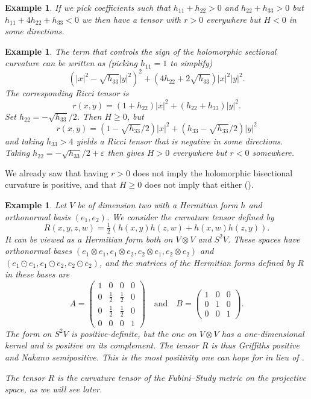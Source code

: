 \documentclass[11pt]{article}
\newtheorem{exam}[theo]{Example}
\def\qandq{\quad\text{and}\quad}
\begin{document}
\begin{exam}
If we pick coefficients such that $h_{11} + h_{22} > 0$ and $h_{22} + h_{33} > 0$ but $h_{11} + 4h_{22} + h_{33} < 0$ we then have a tensor with $r > 0$ everywhere but $H < 0$ in some directions.
\end{exam}

\begin{exam}
The term that controls the sign of the holomorphic sectional curvature can be written as (picking $h_{11} = 1$ to simplify)
$$
(|x|^2 - \sqrt{h_{33}}|y|^2)^2 + (4h_{22} + 2\sqrt{h_{33}})|x|^2|y|^2.
$$
The corresponding Ricci tensor is
$$
r(x,y) = (1 + h_{22})|x|^2 + (h_{22} + h_{33}) |y|^2.
$$
Set $h_{22} = -\sqrt{h_{33}}/2$. Then $H \geq 0$, but
$$
r(x,y) = (1-\sqrt{h_{33}}/2)|x|^2 + (h_{33} - \sqrt{h_{33}}/2)|y|^2
$$
and taking $h_{33} > 4$ yields a Ricci tensor that is negative in some directions. Taking $h_{22} = -\sqrt{h_{33}}/2 + \varepsilon$ then gives $H > 0$ everywhere but $r < 0$ somewhere.
\end{exam}

We already saw that having $r > 0$ does not imply the holomorphic bisectional curvature is positive, and that $H \geq 0$ does not imply that either ().


\begin{exam}
Let $V$ be of dimension two with a Hermitian form $h$ and orthonormal basis $(e_1,e_2)$. We consider the curvature tensor defined by
$$
R(x,y,z,w) = \tfrac12( h(x,y)h(z,w) + h(x,w)h(z,y)).
$$
It can be viewed as a Hermitian form both on $V \otimes V$ and $S^2V$. These spaces have orthonormal bases $(e_1 \otimes e_1, e_1 \otimes e_2, e_2 \otimes e_1, e_2 \otimes e_2)$ and $(e_1 \odot e_1, e_1 \odot e_2, e_2 \odot e_2)$, and the matrices of the Hermitian forms defined by $R$ in these bases are
$$
A = \begin{pmatrix}
  1 & 0 & 0 & 0 \\
  0 & \tfrac12 & \tfrac12 & 0 \\
  0 & \tfrac12 & \tfrac12 & 0 \\
  0 & 0 & 0 & 1
\end{pmatrix}
\qandq
B = \begin{pmatrix}
  1 & 0 & 0 \\
  0 & 1 & 0 \\
  0 & 0 & 1
\end{pmatrix}.
$$
The form on $S^2V$ is positive-definite, but the one on $V \otimes V$ has a one-dimensional kernel and is positive on its complement. The tensor $R$ is thus Griffiths positive and Nakano semipositive. This is the most positivity one can hope for in lieu of .

The tensor $R$ is the curvature tensor of the Fubini--Study metric on the projective space, as we will see later.
\end{exam}
\end{document}
